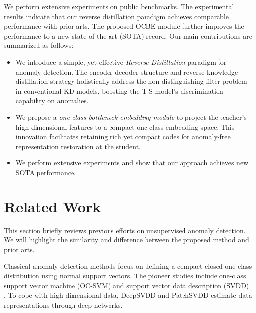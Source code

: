 \documentclass[10pt,twocolumn,letterpaper]{article}
\begin{document}
We perform extensive experiments on public benchmarks. The experimental results indicate that our reverse distillation paradigm achieves comparable performance with prior arts. The proposed OCBE module further improves the performance to a new state-of-the-art (SOTA) record. Our main contributions are summarized as follows:
\begin{itemize}
  \item We introduce a simple, yet effective \emph{Reverse Distillation} paradigm for anomaly detection. The encoder-decoder structure and reverse knowledge distillation strategy holistically address the non-distinguishing filter problem in conventional KD models, boosting the T-S model's discrimination capability on anomalies.
  \item We propose a \emph{one-class bottleneck embedding module} to project the teacher's high-dimensional features to a compact one-class embedding space. This innovation facilitates retaining rich yet compact codes for anomaly-free representation restoration at the student.
  \item We perform extensive experiments and show that our approach achieves new SOTA performance.
\end{itemize}




\section{Related Work}\label{sec:rw}
This section briefly reviews previous efforts on unsupervised anomaly detection. We will highlight the similarity and difference between the proposed method and prior arts.

Classical anomaly detection methods focus on defining a compact closed one-class distribution using normal support vectors. The pioneer studies include one-class support vector machine (OC-SVM) \cite{ocsvm} and support vector data description (SVDD) \cite{svdd}. To cope with high-dimensional data, DeepSVDD \cite{dsvdd} and PatchSVDD  \cite{psvdd} estimate data representations through deep networks. 
\end{document}
